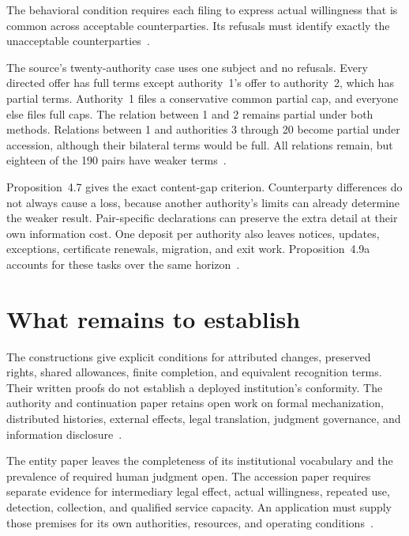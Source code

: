 \documentclass{momentum}
\begin{document}
The behavioral condition requires each filing to express actual willingness that is common across acceptable counterparties.
Its refusals must identify exactly the unacceptable counterparties~\cite[Sections~4.1--4.2]{accession}.

The source's twenty-authority case uses one subject and no refusals.
Every directed offer has full terms except authority~1's offer to authority~2, which has partial terms.
Authority~1 files a conservative common partial cap, and everyone else files full caps.
The relation between 1 and 2 remains partial under both methods.
Relations between 1 and authorities 3 through 20 become partial under accession, although their bilateral terms would be full.
All relations remain, but eighteen of the 190 pairs have weaker terms~\cite[Section~4.6, ``A useful profile beyond (H5)'']{accession}.

Proposition~4.7 gives the exact content-gap criterion.
Counterparty differences do not always cause a loss, because another authority's limits can already determine the weaker result.
Pair-specific declarations can preserve the extra detail at their own information cost.
One deposit per authority also leaves notices, updates, exceptions, certificate renewals, migration, and exit work.
Proposition~4.9a accounts for these tasks over the same horizon~\cite[Sections~4.3--4.5]{accession}.

\section{What remains to establish}
\label{sec:limits}

The constructions give explicit conditions for attributed changes, preserved rights, shared allowances, finite completion, and equivalent recognition terms.
Their written proofs do not establish a deployed institution's conformity.
The authority and continuation paper retains open work on formal mechanization, distributed histories, external effects, legal translation, judgment governance, and information disclosure~\cite[Section~10]{institutions}.

The entity paper leaves the completeness of its institutional vocabulary and the prevalence of required human judgment open.
The accession paper requires separate evidence for intermediary legal effect, actual willingness, repeated use, detection, collection, and qualified service capacity.
An application must supply those premises for its own authorities, resources, and operating conditions~\cite[Section~8]{entity}\cite[Sections~7.4, 7.8, and 10]{accession}.
\end{document}
